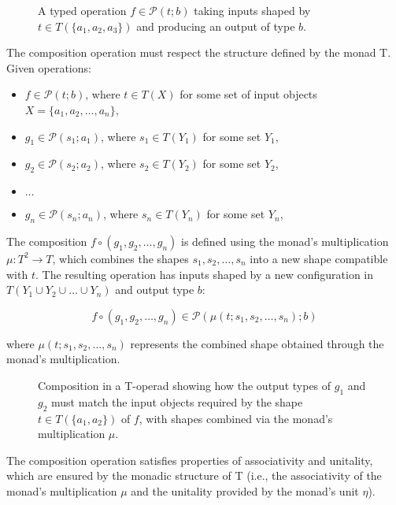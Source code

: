 \begin{figure}[h]
\centering

\caption{A typed operation $f \in \mathcal{P}(t; b)$ taking inputs shaped by $t \in T(\{a_1, a_2, a_3\})$ and producing an output of type $b$.}
\label{fig:shaped-operation}
\end{figure}

The composition operation must respect the structure defined by the monad T. Given operations:
\begin{itemize}
  \item $f \in \mathcal{P}(t; b)$, where $t \in T(X)$ for some set of input objects $X = \{a_1, a_2, \ldots, a_n\}$,
  \item $g_1 \in \mathcal{P}(s_1; a_1)$, where $s_1 \in T(Y_1)$ for some set $Y_1$,
  \item $g_2 \in \mathcal{P}(s_2; a_2)$, where $s_2 \in T(Y_2)$ for some set $Y_2$,
  \item $\ldots$
  \item $g_n \in \mathcal{P}(s_n; a_n)$, where $s_n \in T(Y_n)$ for some set $Y_n$,
\end{itemize}

The composition $f \circ (g_1, g_2, \ldots, g_n)$ is defined using the monad's multiplication $\mu: T^2 \to T$, which combines the shapes $s_1, s_2, \ldots, s_n$ into a new shape compatible with $t$. The resulting operation has inputs shaped by a new configuration in $T(Y_1 \cup Y_2 \cup \ldots \cup Y_n)$ and output type $b$:

\begin{equation}
  f \circ (g_1, g_2, \ldots, g_n) \in \mathcal{P}(\mu(t; s_1, s_2, \ldots, s_n); b)
\end{equation}

where $\mu(t; s_1, s_2, \ldots, s_n)$ represents the combined shape obtained through the monad's multiplication.

\begin{figure}[h]
\centering

\caption{Composition in a T-operad showing how the output types of $g_1$ and $g_2$ must match the input objects required by the shape $t \in T(\{a_1, a_2\})$ of $f$, with shapes combined via the monad's multiplication $\mu$.}
\label{fig:t-operadic-composition}
\end{figure}

The composition operation satisfies properties of associativity and unitality, which are ensured by the monadic structure of T (i.e., the associativity of the monad's multiplication $\mu$ and the unitality provided by the monad's unit $\eta$).


